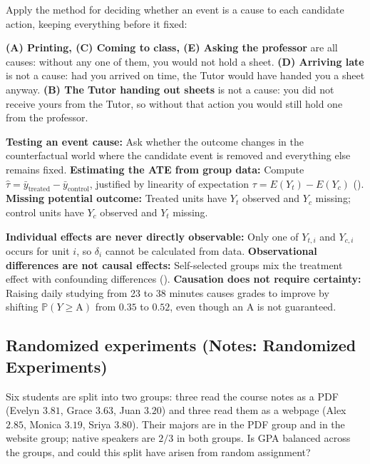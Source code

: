 \documentclass[10pt]{scrartcl}
\begin{document}
\revisit Apply the method for deciding whether an event is a cause to each candidate action, keeping everything before it fixed:
\begin{itemize}
  \ii \textbf{(A) Printing, (C) Coming to class, (E) Asking the professor} are all causes: without any one of them, you would not hold a sheet.
  \ii \textbf{(D) Arriving late} is not a cause: had you arrived on time, the Tutor would have handed you a sheet anyway.
  \ii \textbf{(B) The Tutor handing out sheets} is not a cause: you did not receive yours from the Tutor, so without that action you would still hold one from the professor.
\end{itemize}

\begin{shortcuts}
  \ii \textbf{Testing an event cause:} Ask whether the outcome changes in the counterfactual world where the candidate event is removed and everything else remains fixed.
  \ii \textbf{Estimating the ATE from group data:} Compute $\hat\tau = \bar y_{\text{treated}} - \bar y_{\text{control}}$, justified by linearity of expectation $\tau = E(Y_t) - E(Y_c)$ ().
  \ii \textbf{Missing potential outcome:} Treated units have $Y_t$ observed and $Y_c$ missing; control units have $Y_c$ observed and $Y_t$ missing.
\end{shortcuts}

\begin{trapbox}
  \ii \textbf{Individual effects are never directly observable:} Only one of $Y_{t,i}$ and $Y_{c,i}$ occurs for unit $i$, so $\delta_i$ cannot be calculated from data.
  \ii \textbf{Observational differences are not causal effects:} Self-selected groups mix the treatment effect with confounding differences ().
  \ii \textbf{Causation does not require certainty:} Raising daily studying from 23 to 38 minutes causes grades to improve by shifting $\mathbb P(Y \ge \text{A})$ from $0.35$ to $0.52$, even though an A is not guaranteed.
\end{trapbox}

\subsection{Randomized experiments (Notes: Randomized Experiments)}

\begin{qbox}
  Six students are split into two groups: three read the course notes as a PDF (Evelyn $3.81$, Grace $3.63$, Juan $3.20$) and three read them as a webpage (Alex $2.85$, Monica $3.19$, Sriya $3.80$). Their majors are  in the PDF group and  in the website group; native speakers are $2/3$ in both groups. Is GPA balanced across the groups, and could this split have arisen from random assignment?
\end{qbox}
\end{document}
